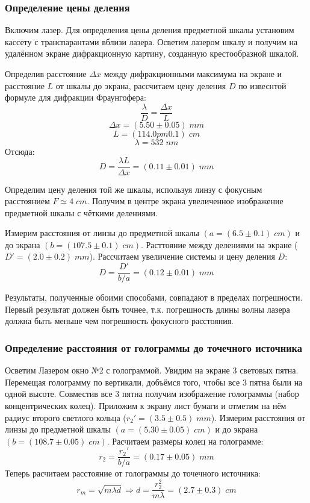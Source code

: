 \documentclass{article}
\begin{document}
\subsubsection{Определение цены деления}
Включим лазер. Для определения цены деления предметной шкалы установим кассету с транспарантами вблизи лазера.
Осветим лазером шкалу и получим на удалённом экране дифракционную картину, созданную крестообразной шкалой.

Определив расстояние \(\Delta x\) между дифракционными максимума на экране и расстояние \(L\) от шкалы до
экрана, рассчитаем цену деления \(D\) по извеснтой формуле для дифракции Фраунгофера:
\[\frac{\lambda}{D} = \frac{\Delta x}{L}\]
\[\Delta x = (5.50 \pm 0.05)\;mm\]
\[L = (114.0pm0.1)\; cm\]
\[\lambda = 532\; nm\]
Отсюда:
\[D = \frac{\lambda L}{\Delta x} = (0.11 \pm 0.01)\; mm\]

Определим цену деления той же шкалы, используя линзу с фокусным расстоянием \(F \simeq 4\;cm\).
Получим в центре экрана увеличенное изображение предметной шкалы с чёткими делениями.

Измерим расстояния от линзы до предметной шкалы \((a = (6.5\pm0.1)\; cm)\) и до экрана \((b = (107.5\pm 0.1)\;cm)\).
Расттояние между делениями на экране (\(D' = (2.0 \pm 0.2)\; mm \)).
Рассчитаем увеличение системы и цену деления \(D\):
\[ D = \frac{D'}{b/a} = (0.12\pm0.01)\;mm \]

Результаты, полученные обоими способами, совпадают в пределах погрешности. Первый результат должен быть точнее, т.к. погрешность
длины волны лазера должна быть меньше чем погрешность фокусного расстояния.

\subsubsection{Определение расстояния от голограммы до точечного источника}
Осветим Лазером окно №2 с голограммой. Увидим на экране 3 световых пятна. Перемещая голограмму по вертикали, добъёмся того, чтобы
все 3 пятна были на одной высоте. Совместив все 3 пятна получим изображение голограммы (набор концентрических колец).
Приложим к экрану лист бумаги и отметим на нём радиус второго светлого кольца (\( r_2' = (3.5 \pm 0.5)\; mm\)).
Измерим расстояния от линзы до предметной шкалы \((a = (5.30\pm0.05)\; cm)\) и до экрана \((b = (108.7\pm 0.05)\;cm)\).
Расчитаем размеры колец на голограмме:
\[r_2 = \frac{r_2'}{b/a} = (0.17 \pm 0.05)\; mm\]
Теперь расчитаем расстояние от голограммы до точечного источника:
\[ r_m = \sqrt{m\lambda d} \Rightarrow d = \frac{r_2^2}{m\lambda} = (2.7\pm0.3)\; cm\]
\end{document}
